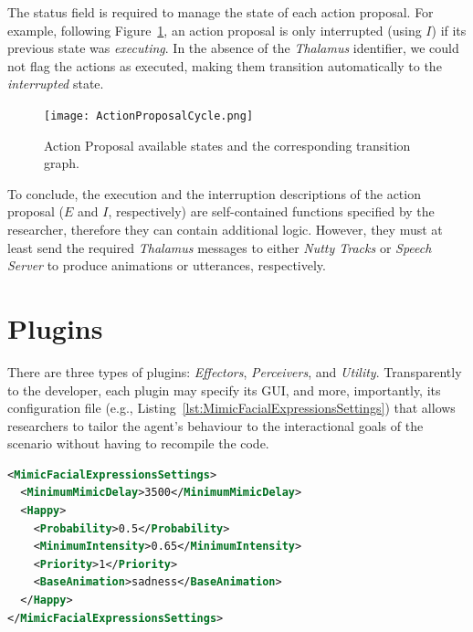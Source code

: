 The status field is required to manage the state of each action proposal. For example, following Figure~\ref{fig:actionProposalStatus}, an action proposal is only interrupted (using $I$) if its previous state was \textit{executing}. In the absence of the \textit{Thalamus} identifier, we could not flag the actions as executed, making them transition automatically to the \textit{interrupted} state.

\begin{figure}[H]
	\centering
	\texttt{[image: ActionProposalCycle.png]}
	\caption{Action Proposal available states and the corresponding transition graph.}
	\label{fig:actionProposalStatus}
\end{figure}

To conclude, the execution and the interruption descriptions of the action proposal ($E$ and $I$, respectively) are self-contained functions specified by the researcher, therefore they can contain additional logic. However, they must at least send the required \textit{Thalamus} messages to either \textit{Nutty Tracks} or \textit{Speech Server} to produce animations or utterances, respectively.


\section{Plugins}
\label{sec:plugins}

There are three types of plugins: \textit{Effectors}, \textit{Perceivers}, and \textit{Utility}. Transparently to the developer, each plugin may specify its \ac{GUI}, and more, importantly, its configuration file (e.g., Listing~\ref{lst:MimicFacialExpressionsSettings}) that allows researchers to tailor the agent's behaviour to the interactional goals of the scenario without having to recompile the code.


\begin{lstlisting}[caption={Excerpt of the \ac{XML} configuration file used by Mimic Facial Expressions \textit{Effector}.}, label={lst:MimicFacialExpressionsSettings},language=XML]
<MimicFacialExpressionsSettings>
  <MinimumMimicDelay>3500</MinimumMimicDelay>
  <Happy>
    <Probability>0.5</Probability>
    <MinimumIntensity>0.65</MinimumIntensity>
    <Priority>1</Priority>
    <BaseAnimation>sadness</BaseAnimation>
  </Happy>
</MimicFacialExpressionsSettings>
\end{lstlisting}


